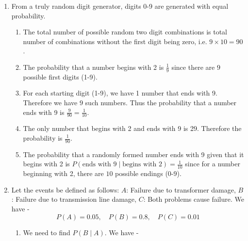 \begin{enumerate}
\begin{enumerate}
        \[P(\text{none}) = 1 - P(A \union B \union C)\]
        Using inclusion-exclusion,
        \[P(A \union B \union C) = P(A) + P(B) + P(C) - P(A \intersect B) - P(A \intersect C) - P(B \intersect C) + P(A \intersect B \intersect C)\]
        \[= 0.1 + 0.3 + 0.05 - 0.08 - 0.02 - 0.04 + 0.01 = 0.32\]
        Thus,
        \[\boxed{P(\text{none}) = 1 - 0.32 = 0.68}
        \]
        \item People who read exactly one morning paper and the evening paper:
        \[P(\text{exactly one morning and evening}) = P(\text{only } A \intersect C) + P(\text{only } B \intersect C)\]
        \[= (P(A \intersect C) - P(A \intersect B \intersect C)) + (P(B \intersect C) - P(A \intersect B \intersect C))\]
        \[= (0.02 - 0.01) + (0.04 - 0.01) = 0.04\]
        Thus,
        \[\boxed{P(\text{exactly one morning and evening}) = 0.04}
        \]
    \end{enumerate}
    \item From a truly random digit generator, digits 0-9 are generated with equal probability.
    \begin{enumerate}
        \item The total number of possible random two digit combinations is total number of combinations without the first digit being zero, i.e. $9\times 10 = 90$. 
        \item The probability that a number begins with 2 is $\frac{1}{9}$ since there are $9$ possible first digits (1-9).
        \item For each starting digit (1-9), we have 1 number that ends with 9. Therefore we have $9$ such numbers. Thus the probability that a number ends with 9 is $\frac{9}{90}=\frac{1}{10}$.
        \item The only number that begins with 2 and ends with 9 is 29. Therefore the probability is $\frac{1}{90}$.
        \item The probability that a randomly formed number ends with 9 given that it begins with 2 is $P(\text{ends with 9}\mid \text{begins with 2})=\frac{1}{10}$ since for a number beginning with 2, there are $10$ possible endings (0-9).
    \end{enumerate}
    \item Let the events be defined as follows:
    $A$: Failure due to transformer damage, $B$: Failure due to transmission line damage, $C$: Both problems cause failure. We have -
    $$P(A) = 0.05, \quad P(B) = 0.8, \quad P(C) = 0.01$$
    \begin{enumerate}
        \item We need to find $P(B \mid A)$. We have - 

\end{enumerate}
\end{enumerate}
